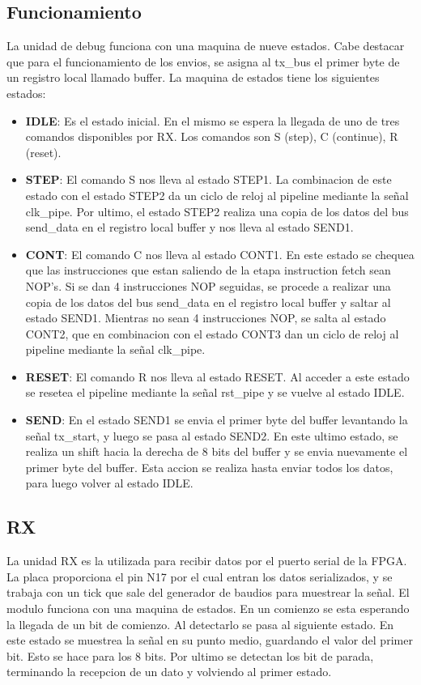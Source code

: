 \subsection{Funcionamiento}
La unidad de debug funciona con una maquina de nueve estados. Cabe destacar que para el funcionamiento de los envios, se asigna al tx_bus el primer byte de un registro local llamado buffer. La maquina de estados tiene los siguientes estados:
\begin{itemize}
	\item \textbf{IDLE}: Es el estado inicial. En el mismo se espera la llegada de uno de tres comandos disponibles por RX. Los comandos son S (step), C (continue), R (reset). 
	\item \textbf{STEP}: El comando S nos lleva al estado STEP1. La combinacion de este estado con el estado STEP2 da un ciclo de reloj al pipeline mediante la señal clk_pipe. Por ultimo, el estado STEP2 realiza una copia de los datos del bus send_data en el registro local buffer y nos lleva al estado SEND1.
	\item \textbf{CONT}: El comando C nos lleva al estado CONT1. En este estado se chequea que las instrucciones que estan saliendo de la etapa instruction fetch sean NOP's. Si se dan 4 instrucciones NOP seguidas, se procede a realizar una copia de los datos del bus send_data en el registro local buffer y saltar al estado SEND1. Mientras no sean 4 instrucciones NOP, se salta al estado CONT2, que en combinacion con el estado CONT3 dan un ciclo de reloj al pipeline mediante la señal clk_pipe.
	\item \textbf{RESET}: El comando R nos lleva al estado RESET. Al acceder a este estado se resetea el pipeline mediante la señal rst_pipe y se vuelve al estado IDLE.
	\item \textbf{SEND}: En el estado SEND1 se envia el primer byte del buffer levantando la señal tx_start, y luego se pasa al estado SEND2. En este ultimo estado, se realiza un shift hacia la derecha de 8 bits del buffer y se envia nuevamente el primer byte del buffer. Esta accion se realiza hasta enviar todos los datos, para luego volver al estado IDLE.
\end{itemize} 

\subsection{RX}
La unidad RX es la utilizada para recibir datos por el puerto serial de la FPGA. La placa proporciona el pin N17 por el cual entran los datos serializados, y se trabaja con un tick que sale del generador de baudios para muestrear la señal.
El modulo funciona con una maquina de estados. En un comienzo se esta esperando la llegada de un bit de comienzo. Al detectarlo se pasa al siguiente estado. En este estado se muestrea la señal en su punto medio, guardando el valor del primer bit. Esto se hace para los 8 bits. Por ultimo se detectan los bit de parada, terminando la recepcion de un dato y volviendo al primer estado.  

